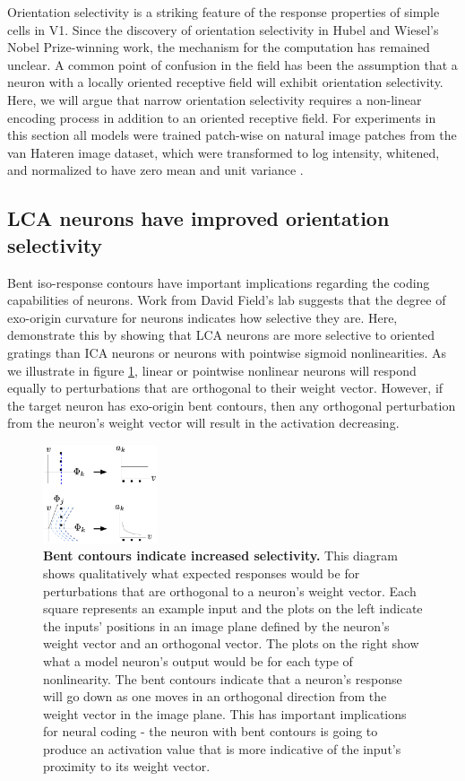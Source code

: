 Orientation selectivity is a striking feature of the response properties of simple cells in V1.
Since the discovery of orientation selectivity in Hubel and Wiesel's Nobel Prize-winning work, the mechanism for the computation has remained unclear.
A common point of confusion in the field has been the assumption that a neuron with a locally oriented receptive field will exhibit orientation selectivity.
Here, we will argue that narrow orientation selectivity requires a non-linear encoding process in addition to an oriented receptive field.
For experiments in this section all models were trained patch-wise on natural image patches from the van Hateren image dataset, which were transformed to log intensity, whitened, and normalized to have zero mean and unit variance \parencite{hateren1998independent}.

\subsection{LCA neurons have improved orientation selectivity}
Bent iso-response contours have important implications regarding the coding capabilities of neurons.
Work from David Field's lab \parencite{golden2016conjectures, vilankar2017selectivity} suggests that the degree of exo-origin curvature for neurons indicates how selective they are.
Here, demonstrate this by showing that LCA neurons are more selective to oriented gratings than ICA neurons or neurons with pointwise sigmoid nonlinearities.
As we illustrate in figure \ref{fig:ch4_lca_selectivity_diagram}, linear or pointwise nonlinear neurons will respond equally to perturbations that are orthogonal to their weight vector.
However, if the target neuron has exo-origin bent contours, then any orthogonal perturbation from the neuron's weight vector will result in the activation decreasing.

\begin{figure}[hb]
    \centering
    \includegraphics[width=0.3\textwidth]{figures/lca_selectivity_diagram.png}
    \caption{\textbf{Bent contours indicate increased selectivity.} This diagram shows qualitatively what expected responses would be for perturbations that are orthogonal to a neuron's weight vector. Each square represents an example input and the plots on the left indicate the inputs' positions in an image plane defined by the neuron's weight vector and an orthogonal vector. The plots on the right show what a model neuron's output would be for each type of nonlinearity. The bent contours indicate that a neuron's response will go down as one moves in an orthogonal direction from the weight vector in the image plane. This has important implications for neural coding - the neuron with bent contours is going to produce an activation value that is more indicative of the input's proximity to its weight vector.}
    \label{fig:ch4_lca_selectivity_diagram}
\end{figure}

